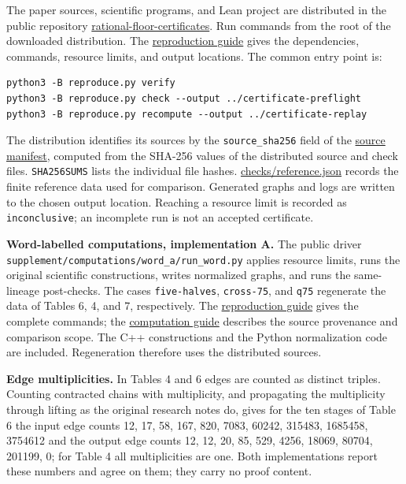 \documentclass[11pt,reqno]{amsart}
\theoremstyle{definition}
\theoremstyle{remark}
\begin{document}
The paper sources, scientific programs, and Lean project are distributed in
the public repository \href{https://github.com/ixixi/rational-floor-certificates}{rational-floor-certificates}.
Run commands from the root of the downloaded distribution. The \href{REPRODUCE.md}{reproduction guide}
gives the dependencies, commands, resource limits, and output locations.
The common entry point is:

\begin{Verbatim}[fontsize=\small,breaklines=true,breakanywhere=true]
python3 -B reproduce.py verify
python3 -B reproduce.py check --output ../certificate-preflight
python3 -B reproduce.py recompute --output ../certificate-replay
\end{Verbatim}

The distribution identifies its sources by the \nolinkurl{source_sha256}
field of the \href{MANIFEST.json}{source manifest}, computed from the SHA-256 values of the
distributed source and check files. \nolinkurl{SHA256SUMS} lists the
individual file hashes. \href{checks/reference.json}{checks/reference.json} records the finite reference
data used for comparison. Generated graphs and logs are written to the
chosen output location. Reaching a resource limit is recorded as
\nolinkurl{inconclusive}; an incomplete run is not an accepted certificate.

\textbf{Word-labelled computations, implementation A.} The public driver
\nolinkurl{supplement/computations/word_a/run_word.py}
applies resource limits, runs the original scientific constructions, writes
normalized graphs, and runs the same-lineage post-checks. The cases
\nolinkurl{five-halves}, \nolinkurl{cross-75}, and \nolinkurl{q75} regenerate the data of Tables 6, 4,
and 7, respectively. The \href{REPRODUCE.md}{reproduction guide} gives the complete commands;
the \href{supplement/COMPUTATION.md}{computation guide} describes the source provenance and comparison scope.
The C++ constructions and the Python normalization code are included.
Regeneration therefore uses the distributed sources.

\textbf{Edge multiplicities.} In Tables 4 and 6 edges are counted as distinct
triples. Counting contracted chains with multiplicity, and propagating
the multiplicity through lifting as the original research notes do,
gives for the ten stages of Table 6 the input edge counts 12, 17, 58,
167, 820, 7083, 60242, 315483, 1685458, 3754612 and the output edge
counts 12, 12, 20, 85, 529, 4256, 18069, 80704, 201199, 0; for Table 4
all multiplicities are one. Both implementations report these numbers
and agree on them; they carry no proof content.
\end{document}
